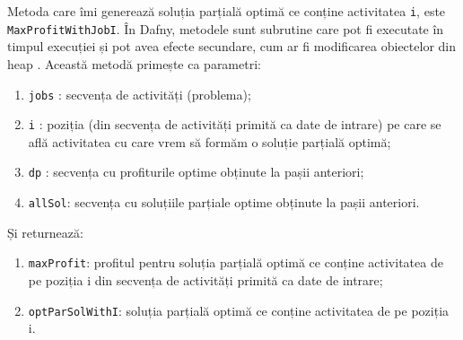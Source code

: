 Metoda care îmi generează soluția parțială optimă ce conține activitatea \texttt{i}, este \\\texttt{MaxProfitWithJobI}. În Dafny, metodele sunt subrutine care pot fi executate în timpul execuției și pot avea efecte secundare, cum ar fi modificarea obiectelor din heap \citep{dafny-reference-manual}.
Această metodă primește ca parametri: 
\begin{enumerate}
    \item \texttt{jobs} : secvența de activități (problema);
    \item \texttt{i} : poziția (din secvența de activități primită ca date de intrare) pe care se află activitatea cu care vrem să formăm o soluție parțială optimă;  
    \item \texttt{dp} : secvența cu profiturile optime obținute la pașii anteriori;
    \item \texttt{allSol}: secvența cu soluțiile parțiale optime obținute la pașii anteriori.
\end{enumerate}
Și returnează:
\begin{enumerate}
    \item \texttt{maxProfit}: profitul pentru soluția parțială optimă ce conține activitatea de pe poziția i din secvența de activități primită ca date de intrare;
    \item \texttt{optParSolWithI}: soluția parțială optimă ce conține activitatea de pe poziția i.
\end{enumerate}
